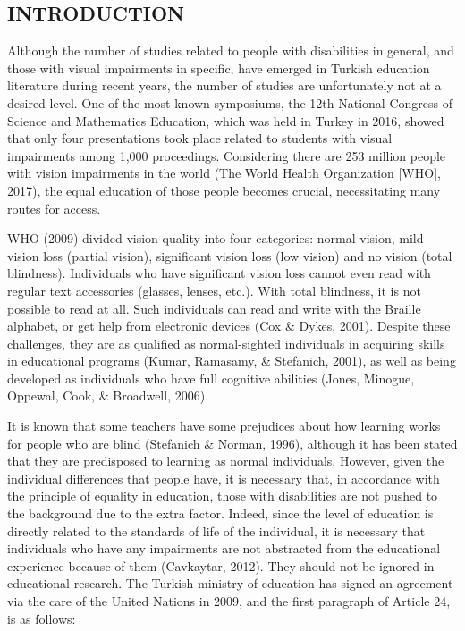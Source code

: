 \documentclass[11.5pt]{sig-alternate} %
\begin{document}
\begin{large}
\section*{INTRODUCTION}

Although the number of studies related to people with disabilities in general, and those with visual impairments in specific, have emerged in Turkish education literature during recent years, the number of studies are unfortunately not at a desired level. One of the most known symposiums, the 12th National Congress of Science and Mathematics Education, which was held in Turkey in 2016, showed that only four presentations took place related to students with visual impairments among 1,000 proceedings. Considering there are 253 million people  with vision impairments in the world (The World Health Organization [WHO], 2017), the equal education of those people becomes crucial, necessitating many routes for access. 

WHO (2009) divided vision quality into four categories: normal vision, mild vision loss (partial vision), significant vision loss (low vision) and no vision (total blindness). Individuals who have significant vision loss cannot even read with regular text accessories (glasses, lenses, etc.). With total blindness, it is not possible to read at all. Such individuals can read and write with the Braille alphabet, or get help from electronic devices (Cox \& Dykes, 2001). Despite these challenges, they are as qualified as normal-sighted individuals in acquiring skills in educational programs (Kumar, Ramasamy, \& Stefanich, 2001), as well as being developed as individuals who have full cognitive abilities (Jones, Minogue, Oppewal, Cook, \& Broadwell, 2006). 

It is known that some teachers have some prejudices about how learning works for people who are blind (Stefanich \& Norman, 1996), although it has been stated that they are predisposed to learning as normal individuals. However, given the individual differences that people have, it is necessary that, in accordance with the principle of equality in education, those with disabilities are not pushed to the background due to the extra factor. Indeed, since the level of education is directly related to the standards of life of the individual, it is necessary that individuals who have any impairments are not abstracted from the educational experience because of them (Cavkaytar, 2012). They should not be ignored in educational research. The Turkish ministry of education has signed an agreement via the care of the United Nations in 2009, and the first paragraph of Article 24, is as follows:


\end{large}
\end{document}
